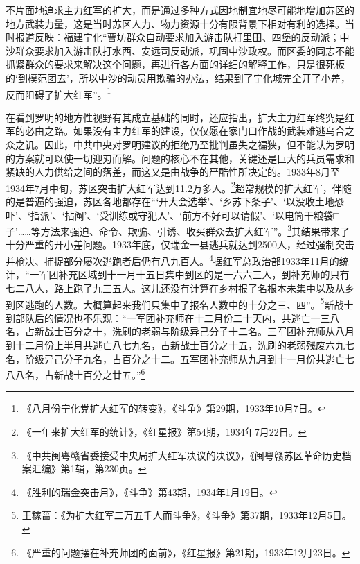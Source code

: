 不片面地追求主力红军的扩大，而是通过多种方式因地制宜地尽可能地增加苏区的地方武装力量，这是当时苏区人力、物力资源十分有限背景下相对有利的选择。当时报道反映：福建宁化“曹坊群众自动要求加入游击队打里田、四堡的反动派；中沙群众要求加入游击队打水西、安远司反动派，巩固中沙政权。而区委的同志不能抓紧群众的要求来解决这个问题，再进行各方面的详细的解释工作，只是很死板的‘到模范团去’，所以中沙的动员用欺骗的办法，结果到了宁化城完全开了小差，反而阻碍了扩大红军”。\footnote{《八月份宁化党扩大红军的转变》，《斗争》第29期，1933年10月7日。}


在看到罗明的地方性视野有其成立基础的同时，还应指出，扩大主力红军终究是红军的必由之路。如果没有主力红军的建设，仅仅愿在家门口作战的武装难逃乌合之众之讥。因此，中共中央对罗明建议的拒绝乃至批判虽失之褊狭，但不能认为罗明的方案就可以使一切迎刃而解。问题的核心不在其他，关键还是巨大的兵员需求和紧缺的人力供给之间的落差，而这又是由战争的严酷性所决定的。1933年8月至1934年7月中旬，苏区突击扩大红军达到11.2万多人。\footnote{《一年来扩大红军的统计》，《红星报》第54期，1934年7月22日。}超常规模的扩大红军，伴随的是普遍的强迫，苏区各地都存在“‘开大会选举’、‘乡苏下条子’、‘以没收土地恐吓’、‘指派’、‘拈阄’、‘受训练或守犯人’、‘前方不好可以请假’、‘以电筒干粮袋□子’……等方法来强迫、命令、欺骗、引诱、收买群众去扩大红军”。\footnote{《中共闽粤赣省委接受中央局扩大红军决议的决议》，《闽粤赣苏区革命历史档案汇编》第1辑，第230页。}其结果带来了十分严重的开小差问题。1933年底，仅瑞金一县逃兵就达到2500人，经过强制突击并枪决、捕捉部分屡次逃跑者后仍有八九百人。\footnote{《胜利的瑞金突击月》，《斗争》第43期，1934年1月19日。}据红军总政治部1933年11月的统计，“一军团补充区域到十一月十五日集中到区的是一六六三人，到补充师的只有七二八人，路上跑了九三五人。这儿还没有计算在乡村报了名根本未集中以及从乡到区逃跑的人数。大概算起来我们只集中了报名人数中的十分之三、四”。\footnote{王稼蔷：《为扩大红军二万五千人而斗争》，《斗争》第37期，1933年12月5日。}新战士到部队后的情况也不乐观：“一军团补充师在十二月份二十天内，共逃亡一三八名，占新战士百分之十，洗刷的老弱与阶级异己分子十二名。三军团补充师从八月到十二月份上半月共逃亡八七九名，占新战士百分之十五，洗刷的老弱残废六九七名，阶级异己分子九名，占百分之十二。五军团补充师从九月到十一月份共逃亡七八八名，占新战士百分之廿五。”\footnote{《严重的问题摆在补充师团的面前》，《红星报》第21期，1933年12月23日。}


